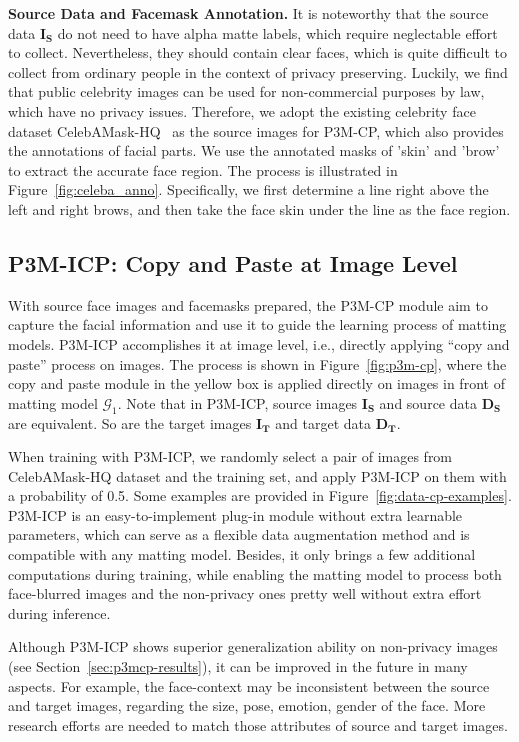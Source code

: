 \documentclass[twocolumn]{svjour3}
\begin{document}
\textbf{Source Data and Facemask Annotation.} 
It is noteworthy that the source data $\mathbf{I_S}$ do not need to have alpha matte labels, which require neglectable effort to collect. Nevertheless, they should contain clear faces, which is quite difficult to collect from ordinary people in the context of privacy preserving. Luckily, we find that public celebrity images can be used for non-commercial purposes by law, which have no privacy issues. Therefore, we adopt the existing celebrity face dataset CelebAMask-HQ~\citep{CelebAMask-HQ} as the source images for P3M-CP, which also provides the annotations of facial parts. We use the annotated masks of 'skin' and 'brow' to extract the accurate face region. The process is illustrated in Figure~\ref{fig:celeba_anno}. Specifically, we first determine a line right above the left and right brows, and then take the face skin under the line as the face region.

\subsection{P3M-ICP: Copy and Paste at Image Level}
With source face images and facemasks prepared, the P3M-CP module aim to capture the facial information and use it to guide the learning process of matting models. P3M-ICP accomplishes it at image level, i.e., directly applying ``copy and paste'' process on images. The process is shown in Figure~\ref{fig:p3m-cp}, where the copy and paste module in the yellow box is applied directly on images in front of matting model $\mathcal{G}_1$. Note that in P3M-ICP, source images $\mathbf{I_S}$ and source data $\mathbf{D_S}$ are equivalent. So are the target images $\mathbf{I_T}$ and target data $\mathbf{D_T}$.


When training with P3M-ICP, we randomly select a pair of images from CelebAMask-HQ dataset and the training set, and apply P3M-ICP on them with a probability of 0.5. Some examples are provided in Figure~\ref{fig:data-cp-examples}. P3M-ICP is an easy-to-implement plug-in module without extra learnable parameters, which can serve as a flexible data augmentation method and is compatible with any matting model. Besides, it only brings a few additional computations during training, while enabling the matting model to process both face-blurred images and the non-privacy ones pretty well without extra effort during inference.

Although P3M-ICP shows superior generalization ability on non-privacy images (see Section~\ref{sec:p3mcp-results}), it can be improved in the future in many aspects. For example, the face-context may be inconsistent between the source and target images, regarding the size, pose, emotion, gender of the face. More research efforts are needed to match those attributes of source and target images.
\end{document}
